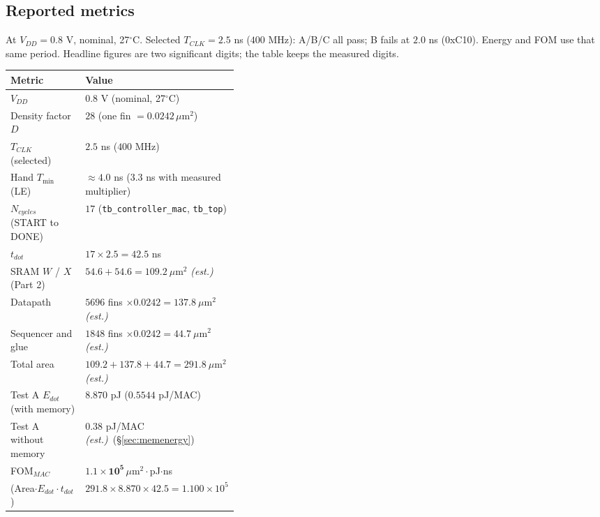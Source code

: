 \documentclass[10pt,letterpaper]{article}
\renewcommand{\arraystretch}{1.32}
\newcommand{\est}{\textit{(est.)}}
\newcommand{\code}[1]{\texttt{#1}}
\newcommand{\sref}[1]{\S\ref{#1}}
\begin{document}
\subsection{Reported metrics}
At $V_{DD}=0.8$ V, nominal, 27$^\circ$C. Selected $T_{CLK}=2.5$ ns ($400$ MHz): A/B/C all pass; B fails at $2.0$ ns (0xC10). Energy and FOM use that same period. Headline figures are two significant digits; the table keeps the measured digits.
\begin{center}\small\renewcommand{\arraystretch}{1.45}%
\begin{tabularx}{\linewidth}{@{}P{0.38\linewidth}L@{}}\toprule
Metric & Value\\\midrule
$V_{DD}$ & $0.8$ V (nominal, 27$^\circ$C)\\\addlinespace
Density factor $D$ & $28$ (one fin $=0.0242\,\mu$m$^2$)\\\addlinespace[0.7em]
$T_{CLK}$ (selected) & $\mathbf{2.5}$ ns ($400$ MHz)\\\addlinespace
Hand $T_{\min}$ (LE) & $\approx4.0$ ns ($3.3$ ns with measured multiplier)\\\addlinespace
$N_{cycles}$ (START to DONE) & $17$ (\code{tb\_controller\_mac}, \code{tb\_top})\\\addlinespace
$t_{dot}$ & $17\times2.5=\mathbf{42.5}$ ns\\\addlinespace[0.7em]
SRAM $W$ / $X$ (Part 2) & $54.6+54.6=109.2\ \mu$m$^2$ \est\\\addlinespace
Datapath & $5696$ fins $\times0.0242=137.8\ \mu$m$^2$ \est\\\addlinespace
Sequencer and glue & $1848$ fins $\times0.0242=44.7\ \mu$m$^2$ \est\\\addlinespace
Total area & $109.2+137.8+44.7=\mathbf{291.8}\ \mu$m$^2$ \est\\\addlinespace[0.7em]
Test A $E_{dot}$ (with memory) & $8.870$ pJ ($0.5544$ pJ/MAC)\\\addlinespace
Test A without memory & $0.38$ pJ/MAC \est\ (\sref{sec:memenergy})\\\addlinespace[0.7em]
FOM$_{MAC}$ & $\mathbf{1.1\times10^{5}}\,\mu$m$^2\cdot$pJ$\cdot$ns\\\addlinespace
\quad (Area$\cdot E_{dot}\cdot t_{dot}$) & $291.8\times8.870\times42.5=1.100\times10^{5}$\\\bottomrule
\end{tabularx}\end{center}
\end{document}
